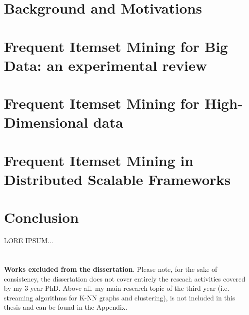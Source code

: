 \documentclass[11pt, a4paper, oneside]{Thesis} %
\begin{document}
\chapter{Background and Motivations}\label{background}


\chapter{Frequent Itemset Mining for Big Data: an experimental review}\label{survey}

\chapter {Frequent Itemset Mining for High-Dimensional data}\label{pampa}

\chapter{Frequent Itemset Mining in Distributed Scalable Frameworks}\label{nemico}


\chapter{Conclusion}\label{thesis_conclusion}
LORE IPSUM...\\\\\\
\textbf{Works excluded from the dissertation}. Please note, for the sake of consistency, the dissertation does not cover entirely the reseach activities covered by my 3-year PhD. Above all, my main research topic of the third year (i.e. streaming algorithms for K-NN graphs and clustering), is not included in this thesis and can be found in the Appendix.



\clearpage




\end{document}
